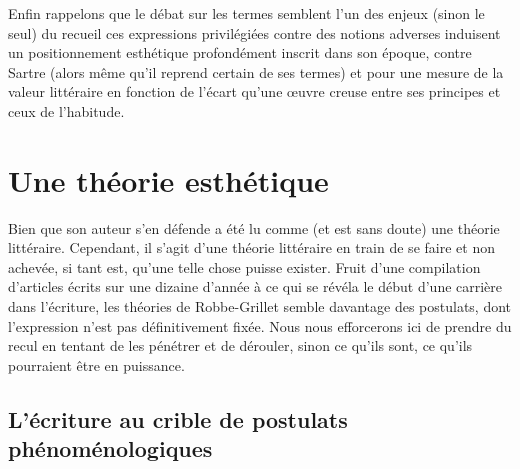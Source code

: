 \documentclass[12pt, a4paper]{article}
\begin{document}


Enfin rappelons que le débat sur les termes semblent l'un des enjeux (sinon le seul) du recueil ces expressions privilégiées contre des notions adverses induisent un positionnement esthétique profondément inscrit dans son époque, contre Sartre (alors même qu'il reprend certain de ses termes) et pour une mesure de la valeur littéraire en fonction de l'écart qu'une œuvre creuse entre ses principes et ceux de l'habitude.


\newpage

\section{Une théorie esthétique}

Bien que son auteur s'en défende \punr{} a été lu comme (et est sans doute) une théorie littéraire. Cependant, il s'agit d'une théorie littéraire en train de se faire et non achevée, si tant est, qu'une telle chose puisse exister. Fruit d'une compilation d'articles écrits sur une dizaine d'année à ce qui se révéla le début d'une carrière dans l'écriture, les théories de Robbe-Grillet semble davantage des postulats, dont l'expression n'est pas définitivement fixée. Nous nous efforcerons ici de prendre du recul en tentant de les pénétrer et de dérouler, sinon ce qu'ils sont, ce qu'ils pourraient être en puissance.

\subsection{L'écriture au crible de postulats phénoménologiques}
\label{3phéno}
\end{document}
